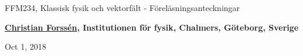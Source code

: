 \documentclass[%
oneside,                 %
final,                   %
10pt]{article}
\begin{document}

\newcommand{\exercisesection}[1]{\subsection*{#1}}







\thispagestyle{empty}

\begin{center}
{\LARGE\bf
\begin{spacing}{1.25}
FFM234, Klassisk fysik och vektorfält - Föreläsningsanteckningar
\end{spacing}
}
\end{center}


\begin{center}
{\bf \href{{http://fy.chalmers.se/subatom/tsp/}}{Christian Forssén}, Institutionen för fysik, Chalmers, Göteborg, Sverige${}^{}$} \\ [0mm]
\end{center}

\begin{center}
\end{center}
    

\begin{center}
Oct 1, 2018
\end{center}

\vspace{1cm}
\end{document}
